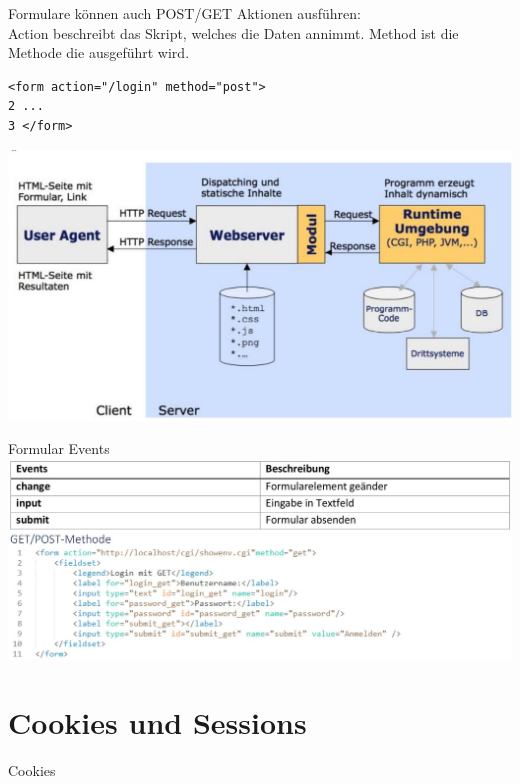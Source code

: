 Formulare können auch POST/GET Aktionen ausführen:\\
Action beschreibt das Skript, welches die Daten annimmt. Method ist die Methode die ausgeführt wird.

\begin{verbatim}
<form action="/login" method="post">
2 ...
3 </form>
\end{verbatim}

\begin{center}
\includegraphics[width=\linewidth]{images/2024_12_29_858f09cde51177c71657g-29(1)}
\end{center}

Formular Events\\
\includegraphics[width=\linewidth]{images/2024_12_29_858f09cde51177c71657g-30}

\section*{Cookies und Sessions}
Cookies

